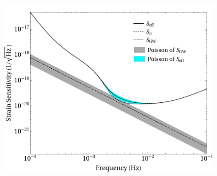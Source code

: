 \documentclass[xcolor={svgnames},compress]{beamer}
\begin{document}
\begin{frame}
\begin{columns}
\begin{column}{0.54\textwidth}
\begin{figure}[htbp!]
                \includegraphics[width = \textwidth]{./pic/lisa-sensitivity-PBH-log.pdf}
            \end{figure}
        \end{column}
    \end{columns}
\end{frame}
\end{document}
